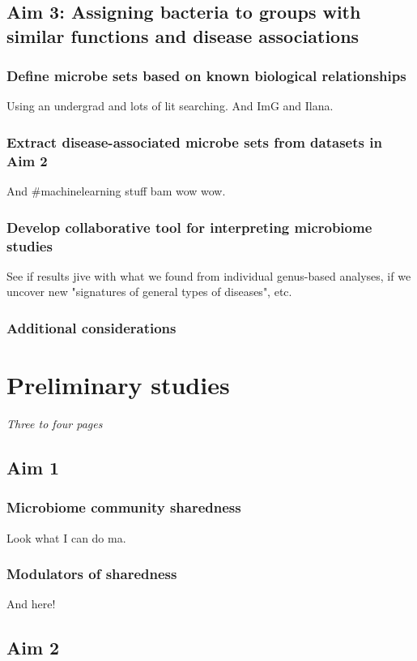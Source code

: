 \documentclass[12pt]{article}
\begin{document}
\subsection{Aim 3: Assigning bacteria to groups with similar functions and disease associations}

\subsubsection{Define microbe sets based on known biological relationships}
Using an undergrad and lots of lit searching. And ImG and Ilana.

\subsubsection{Extract disease-associated microbe sets from datasets in Aim 2}
And \#machinelearning stuff bam wow wow.

\subsubsection{Develop collaborative tool for interpreting microbiome studies}
See if results jive with what we found from individual genus-based analyses, if we uncover new "signatures of general types of diseases", etc.

\subsubsection{Additional considerations}

\section{Preliminary studies}
\textit{Three to four pages}

\subsection{Aim 1}
\subsubsection{Microbiome community sharedness}
Look what I can do ma.

\subsubsection{Modulators of sharedness}
And here!

\subsection{Aim 2}
\end{document}
